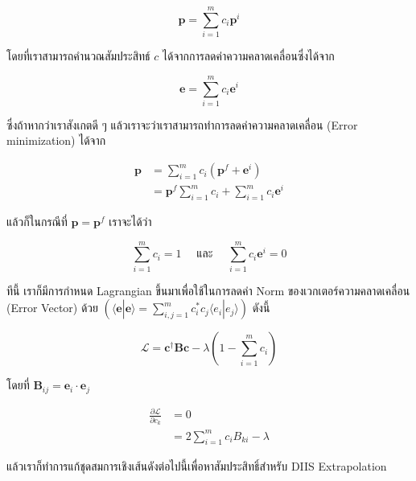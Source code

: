 \begin{equation}
  \mathbf{p}
  =
  \sum_{i=1}^{m} c_i \mathbf{p}^i
\end{equation}

\noindent โดยที่เราสามารถคำนวณสัมประสิทธ์ $c$ ได้จากการลดค่าความคลาดเคลื่อนซึ่งได้จาก

\begin{equation}
  \mathbf{e}
  =
  \sum_{i=1}^{m} c_i \mathbf{e}^i
\end{equation}

\noindent ซึ่งถ้าหากว่าเราสังเกตดี ๆ แล้วเราจะว่าเราสามารถทำการลดค่าความคลาดเคลื่อน (Error minimization) ได้จาก

\begin{align}
  \mathbf{p}
   & =
  \sum_{i=1}^{m} c_i \left( \mathbf{p}^f + \mathbf{e}^i\right) \\
   & =
  \mathbf{p}^f \sum_{i=1}^{m} c_i  + \sum_{i=1}^{m} c_i \mathbf{e}^i
\end{align}

\noindent แล้วก็ในกรณีที่ $\mathbf{p} = \mathbf{p}^f$ เราจะได้ว่า

\begin{equation}
  \sum_{i=1}^{m} c_i = 1
  \quad
  \text{ และ }
  \quad
  \sum_{i=1}^{m} c_i \mathbf{e}^i = 0
\end{equation}

\noindent ทีนี้ เราก็มีการกำหนด Lagrangian ขึ้นมาเพื่อใช้ในการลดค่า Norm ของเวกเตอร์ความคลาดเคลื่อน (Error Vector) ด้วย
$(\langle \mathbf{e} | \mathbf{e} \rangle = \sum_{i,j = 1}^{m} c_i^* c_j \langle e_i | e_j \rangle)$ ดังนี้

\begin{equation}
  \mathcal{L}
  =
  \mathbf{c}^\dagger \mathbf{B} \mathbf{c} - \lambda \left( 1-\sum_{i=1}^m c_i \right)
\end{equation}

\noindent โดยที่ $\mathbf{B}_{ij} = \mathbf{e}_i \cdot \mathbf{e}_j$

\begin{align}
  \frac{\partial\mathcal{L}}{\partial c_k}
   & =
  0    \\
   & =
  2 \sum_{i=1}^m c_i B_{ki} -\lambda
\end{align}

\noindent แล้วเราก็ทำการแก้ชุดสมการเชิงเส้นดังต่อไปนี้เพื่อหาสัมประสิทธิ์สำหรับ DIIS Extrapolation


